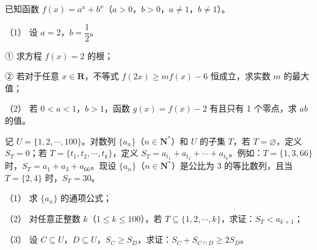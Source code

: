 \begin{question}
已知函数 \(f(x)=a^{x}+b^{x}\)（\(a>0\)，\(b>0\)，\(a\neq1\)，\(b\neq1\)）。

（1） 设 \(a=2\)，\(b=\dfrac{1}{2}\)。

① 求方程 \(f(x)=2\) 的根；

② 若对于任意 \(x\in\mathbf{R}\)，不等式 \(f(2x)\geqslant mf(x)-6\) 恒成立，求实数 \(m\) 的最大值；

（2） 若 \(0<a<1\)，\(b>1\)，函数 \(g(x)=f(x)-2\) 有且只有 1 个零点，求 \(ab\) 的值。

\end{question}
\begin{question}
记 \(U=\{1,2,\cdots,100\}\)。对数列 \(\{a_{n}\}\)（\(n\in\mathbf{N}^{*}\)）和 \(U\) 的子集 \(T\)，若 \(T=\varnothing\)，定义 \(S_{T}=0\)；若 \(T=\{t_{1},t_{2},\cdots,t_{k}\}\)，定义 \(S_{T}=a_{t_{1}}+a_{t_{2}}+\cdots+a_{t_{k}}\)。例如：\(T=\{1,3,66\}\) 时，\(S_{T}=a_{1}+a_{3}+a_{66}\)。现设 \(\{a_{n}\}\)（\(n\in\mathbf{N}^{*}\)）是公比为 3 的等比数列，且当 \(T=\{2,4\}\) 时，\(S_{T}=30\)。

（1） 求 \(\{a_{n}\}\) 的通项公式；

（2） 对任意正整数 \(k\)（\(1\leqslant k\leqslant 100\)），若 \(T\subseteq\{1,2,\cdots,k\}\)，求证：\(S_{T}<a_{k+1}\)；

（3） 设 \(C\subseteq U\)，\(D\subseteq U\)，\(S_{C}\geqslant S_{D}\)，求证：\(S_{C}+S_{C\cap D}\geqslant 2S_{D}\)。

\Needspace{0.4\textheight}
\end{question}
